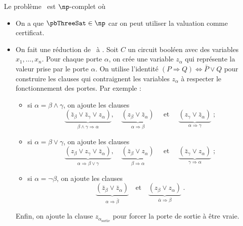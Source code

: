 \documentclass[./main]{subfiles}
\begin{document}
  \begin{thm}
    Le problème \pbThreeSat\ est $\np$-complet où
    \showThreeSat
  \end{thm}
  \begin{prv}
    \begin{itemize}
      \item On a que $\pbThreeSat \in \np$ car on peut utiliser la valuation comme certificat.
      \item On fait une réduction de \pbCircuitSat\ à \pbThreeSat.
        Soit $C$ un circuit booléen avec des variables $x_1, \ldots, x_n$.
        Pour chaque porte $\alpha$, on crée une variable $z_\alpha$ qui représente la valeur prise par le porte $\alpha$.
        On utilise l'identité $(P \Rightarrow Q) \Leftrightarrow \bar{P} \vee Q$ pour construire les clauses qui contraignent les variables $z_\alpha$ à respecter le fonctionnement des portes.
        Par exemple :
        \begin{itemize}
          \item si $\alpha = \beta \wedge \gamma$, on ajoute les clauses 
            \[
              \underbrace{(\bar{z}_\beta \vee \bar{z}_\gamma \vee z_\alpha)}_{\beta \wedge \gamma \Rightarrow \alpha} , \quad \underbrace{(z_\beta \vee \bar{z}_\alpha)}_{\alpha \Rightarrow \beta} \quad \text{ et } \quad \underbrace{(z_\gamma \vee \bar{z}_\alpha)}_{\alpha \Rightarrow \gamma} \;
            ;\] 
          \item si $\alpha = \beta \vee \gamma$, on ajoute les clauses 
            \[
              \underbrace{(z_\beta \vee z_\gamma \vee \bar{z}_\alpha)}_{\alpha \Rightarrow  \beta \vee \gamma} , \quad \underbrace{(\bar{z}_\beta \vee z_\alpha)}_{\beta \Rightarrow \alpha} \quad \text{ et } \quad \underbrace{(\bar{z}_\gamma \vee z_\alpha)}_{\gamma \Rightarrow \alpha} \;
            ;\] 
          \item si $\alpha = \lnot \beta$, on ajoute les clauses 
            \[
              \underbrace{(\bar{z}_\beta \vee \bar{z}_\alpha)}_{\alpha \Rightarrow \bar{\beta}}
              \quad\text{et}\quad
              \underbrace{(z_\beta \vee z_\alpha)}_{\bar{\alpha} \Rightarrow \beta}\;
            .\]
        \end{itemize}
        Enfin, on ajoute la clause $z_{\alpha_\text{sortie}}$ pour forcer la porte de sortie à être vraie.
    \end{itemize}
  \end{prv}
\end{document}
